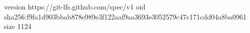 version https://git-lfs.github.com/spec/v1
oid sha256:f9fa1d903bbab878e989e3f122aaf9aa3693e3052579c47c171cdd04a8ba0961
size 1124
